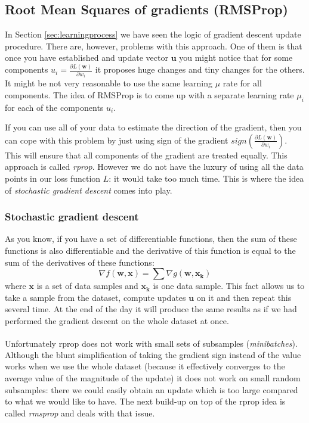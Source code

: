 \documentclass[a4paper,12pt]{article}
\begin{document}
\subsection{Root Mean Squares of gradients (RMSProp)}
In Section \ref{sec:learningprocess} we have seen the logic of gradient descent update procedure. There are, however, problems with this approach. One of them is that once you have established and update vector $\mathbf{u}$ you might notice that for some components $u_i = \frac{\partial L(\mathbf{w})}{\partial w_i}$ it proposes huge changes and tiny changes for the others. It might be not very reasonable to use the same learning $\mu$ rate for all components. The idea of RMSProp is to come up with a separate learning rate $\mu_i$ for each of the components $u_i$.

If you can use all of your data to estimate the direction of the gradient, then you can cope with this problem by just using sign of the gradient $sign(\frac{\partial L(\mathbf{w})}{\partial w_i})$. This will ensure that all components of the gradient are treated equally. This approach is called \emph{rprop}. However we do not have the luxury of using all the data points in our loss function $L$: it would take too much time. This is where the idea of \emph{stochastic gradient descent} comes into play.


\subsubsection{Stochastic gradient descent}
As you know, if you have a set of differentiable functions, then the sum of these functions is also differentiable and the derivative of this function is equal to the sum of the derivatives of these functions:
$$\nabla f(\mathbf{w}, \mathbf{x}) = \displaystyle\sum\nabla g(\mathbf{w}, \mathbf{x_k})$$
where $\mathbf{x}$ is a set of data samples and $\mathbf{x_k}$ is one data sample. This fact allows us to take a sample from the dataset, compute updates $\mathbf{u}$ on it and then repeat this several time. At the end of the day it will produce the same results as if we had performed the gradient descent on the whole dataset at once.

Unfortunately rprop does not work with small sets of subsamples\textsuperscript{\cite{tieleman2012lecture}} (\emph{minibatches}). Although the blunt simplification of taking the gradient sign instead of the value works when we use the whole dataset (because it effectively converges to the average value of the magnitude of the update) it does not work on small random subsamples: there we could easily obtain an update which is too large compared to what we would like to have. The next build-up on top of the rprop idea is called \emph{rmsprop} and deals with that issue.
\end{document}
